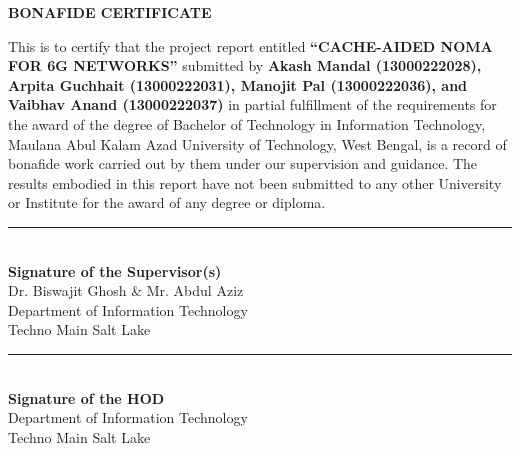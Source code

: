 \documentclass[12pt,a4paper]{article}
\begin{document}
\clearpage
{}
\setcounter{page}{2}

\begin{center}
    {\fontsize{16}{19.2}\selectfont\bfseries BONAFIDE CERTIFICATE}\\[1cm]
\end{center}

\begin{doublespace}
{\fontsize{14}{16.8}\selectfont
This is to certify that the project report entitled \textbf{``CACHE-AIDED NOMA FOR 6G NETWORKS''} submitted by \textbf{Akash Mandal (13000222028), Arpita Guchhait (13000222031), Manojit Pal (13000222036), and Vaibhav Anand (13000222037)} in partial fulfillment of the requirements for the award of the degree of Bachelor of Technology in Information Technology, Maulana Abul Kalam Azad University of Technology, West Bengal, is a record of bonafide work carried out by them under our supervision and guidance. The results embodied in this report have not been submitted to any other University or Institute for the award of any degree or diploma.
}
\end{doublespace}

\vspace{2cm}

\noindent
\begin{minipage}[t]{0.45\textwidth}
    \begin{center}
        \rule{6cm}{1pt}\\
        \textbf{Signature of the Supervisor(s)}\\
        Dr. Biswajit Ghosh \& Mr. Abdul Aziz\\
        Department of Information Technology\\
        Techno Main Salt Lake
    \end{center}
\end{minipage}
\hfill
\begin{minipage}[t]{0.45\textwidth}
    \begin{center}
        \rule{6cm}{1pt}\\
        \textbf{Signature of the HOD}\\
        Department of Information Technology\\
        Techno Main Salt Lake
    \end{center}
\end{minipage}
\end{document}
